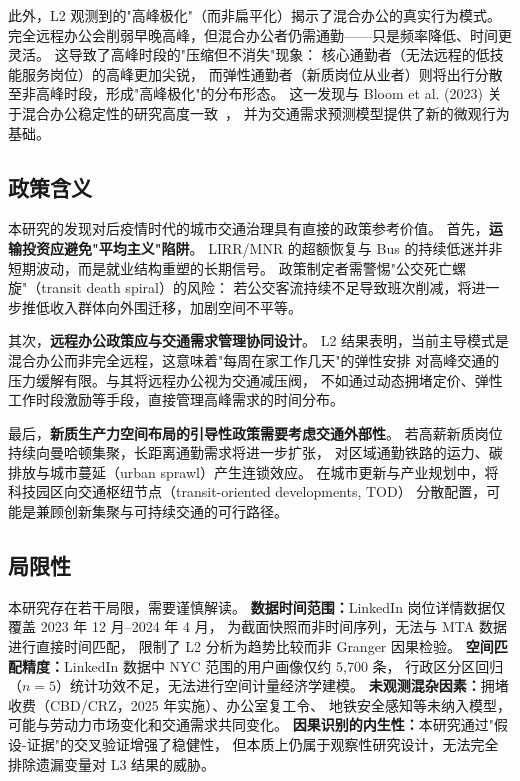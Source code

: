 \documentclass[runningheads]{llncs}
\begin{document}
此外，L2 观测到的"高峰极化"（而非扁平化）揭示了混合办公的真实行为模式。
完全远程办公会削弱早晚高峰，但混合办公者仍需通勤——只是频率降低、时间更灵活。
这导致了高峰时段的"压缩但不消失"现象：
核心通勤者（无法远程的低技能服务岗位）的高峰更加尖锐，
而弹性通勤者（新质岗位从业者）则将出行分散至非高峰时段，形成"高峰极化"的分布形态。
这一发现与 Bloom et al. (2023) 关于混合办公稳定性的研究高度一致~\cite{bloom2023,barrero2021}，
并为交通需求预测模型提供了新的微观行为基础。

\subsection{政策含义}

本研究的发现对后疫情时代的城市交通治理具有直接的政策参考价值。
首先，\textbf{运输投资应避免"平均主义"陷阱}。
LIRR/MNR 的超额恢复与 Bus 的持续低迷并非短期波动，而是就业结构重塑的长期信号。
政策制定者需警惕"公交死亡螺旋"（transit death spiral）的风险：
若公交客流持续不足导致班次削减，将进一步推低收入群体向外围迁移，加剧空间不平等。

其次，\textbf{远程办公政策应与交通需求管理协同设计}。
L2 结果表明，当前主导模式是混合办公而非完全远程，这意味着"每周在家工作几天"的弹性安排
对高峰交通的压力缓解有限。与其将远程办公视为交通减压阀，
不如通过动态拥堵定价、弹性工作时段激励等手段，直接管理高峰需求的时间分布。

最后，\textbf{新质生产力空间布局的引导性政策需要考虑交通外部性}。
若高薪新质岗位持续向曼哈顿集聚，长距离通勤需求将进一步扩张，
对区域通勤铁路的运力、碳排放与城市蔓延（urban sprawl）产生连锁效应。
在城市更新与产业规划中，将科技园区向交通枢纽节点（transit-oriented developments, TOD）
分散配置，可能是兼顾创新集聚与可持续交通的可行路径。

\subsection{局限性}

本研究存在若干局限，需要谨慎解读。
\textbf{数据时间范围：}LinkedIn 岗位详情数据仅覆盖 2023 年 12 月--2024 年 4 月，
为截面快照而非时间序列，无法与 MTA 数据进行直接时间匹配，
限制了 L2 分析为趋势比较而非 Granger 因果检验。
\textbf{空间匹配精度：}LinkedIn 数据中 NYC 范围的用户画像仅约 5,700 条，
行政区分区回归（$n=5$）统计功效不足，无法进行空间计量经济学建模。
\textbf{未观测混杂因素：}拥堵收费（CBD/CRZ，2025 年实施）、办公室复工令、
地铁安全感知等未纳入模型，可能与劳动力市场变化和交通需求共同变化。
\textbf{因果识别的内生性：}本研究通过"假设-证据"的交叉验证增强了稳健性，
但本质上仍属于观察性研究设计，无法完全排除遗漏变量对 L3 结果的威胁。
\end{document}
